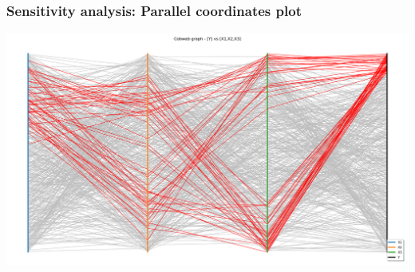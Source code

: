 \documentclass[aspectratio=169]{beamer}
\begin{document}



\begin{frame}
\frametitle{Sensitivity analysis: Parallel coordinates plot}

\centering
\includegraphics[width=.8\textwidth]{figures/CobwebOT.png}


\end{frame}
\end{document}
